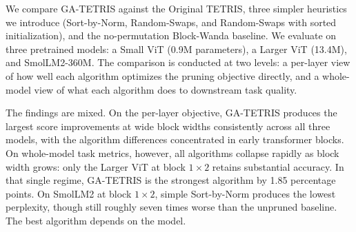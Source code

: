 We compare GA-TETRIS against the Original TETRIS, three simpler heuristics we introduce (Sort-by-Norm, Random-Swaps, and Random-Swaps with sorted initialization), and the no-permutation Block-Wanda baseline. We evaluate on three pretrained models: a Small ViT (0.9M parameters), a Larger ViT (13.4M), and SmolLM2-360M. The comparison is conducted at two levels: a per-layer view of how well each algorithm optimizes the pruning objective directly, and a whole-model view of what each algorithm does to downstream task quality.

The findings are mixed. On the per-layer objective, GA-TETRIS produces the largest score improvements at wide block widths consistently across all three models, with the algorithm differences concentrated in early transformer blocks. On whole-model task metrics, however, all algorithms collapse rapidly as block width grows: only the Larger ViT at block $1 \times 2$ retains substantial accuracy. In that single regime, GA-TETRIS is the strongest algorithm by 1.85 percentage points. On SmolLM2 at block $1 \times 2$, simple Sort-by-Norm produces the lowest perplexity, though still roughly seven times worse than the unpruned baseline. The best algorithm depends on the model.
